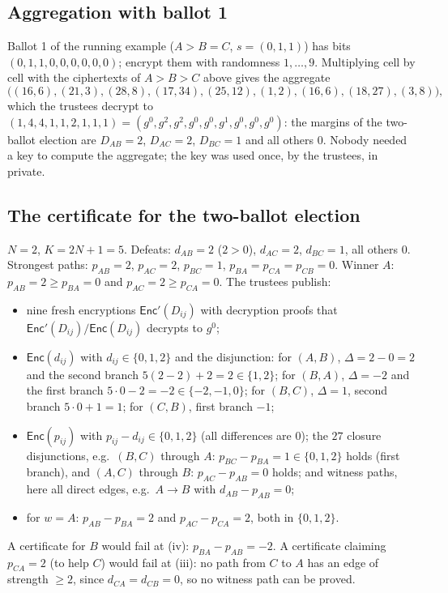 \documentclass[11pt,a4paper]{article}
\newcommand{\Enc}{\mathsf{Enc}}
\theoremstyle{remark}
\begin{document}
\subsection{Aggregation with ballot 1}
Ballot 1 of the running example ($A > B = C$, $s = (0, 1, 1)$) has bits
$(0, 1, 1, 0, 0, 0, 0, 0, 0)$; encrypt them with randomness $1, \ldots,
9$. Multiplying cell by cell with the ciphertexts of $A > B > C$ above
gives the aggregate
\[
  \big((16,6), (21,3), (28,8), (17,34), (25,12), (1,2), (16,6), (18,27), (3,8)\big),
\]
which the trustees decrypt to $(1, 4, 4, 1, 1, 2, 1, 1, 1) = (g^0, g^2,
g^2, g^0, g^0, g^1, g^0, g^0, g^0)$: the margins of the two-ballot
election are $D_{AB} = 2$, $D_{AC} = 2$, $D_{BC} = 1$ and all others
$0$. Nobody needed a key to compute the aggregate; the key was used once,
by the trustees, in private.

\subsection{The certificate for the two-ballot election}
$N = 2$, $K = 2N + 1 = 5$. Defeats: $d_{AB} = 2$ ($2 > 0$), $d_{AC} = 2$,
$d_{BC} = 1$, all others $0$. Strongest paths: $p_{AB} = 2$, $p_{AC} = 2$,
$p_{BC} = 1$, $p_{BA} = p_{CA} = p_{CB} = 0$. Winner $A$: $p_{AB} = 2 \ge
p_{BA} = 0$ and $p_{AC} = 2 \ge p_{CA} = 0$. The trustees publish:
\begin{itemize}[nosep]
  \item[(i)] nine fresh encryptions $\Enc'(D_{ij})$ with decryption
  proofs that $\Enc'(D_{ij}) / \Enc(D_{ij})$ decrypts to $g^0$;
  \item[(ii)] $\Enc(d_{ij})$ with $d_{ij} \in \{0, 1, 2\}$ and the
  disjunction: for $(A, B)$, $\Delta = 2 - 0 = 2$ and the second branch
  $5(2 - 2) + 2 = 2 \in \{1, 2\}$; for $(B, A)$, $\Delta = -2$ and the
  first branch $5 \cdot 0 - 2 = -2 \in \{-2, -1, 0\}$; for $(B, C)$,
  $\Delta = 1$, second branch $5 \cdot 0 + 1 = 1$; for $(C, B)$, first
  branch $-1$;
  \item[(iii)] $\Enc(p_{ij})$ with $p_{ij} - d_{ij} \in \{0, 1, 2\}$ (all
  differences are $0$); the $27$ closure disjunctions, e.g.\ $(B, C)$
  through $A$: $p_{BC} - p_{BA} = 1 \in \{0,1,2\}$ holds (first branch),
  and $(A, C)$ through $B$: $p_{AC} - p_{AB} = 0$ holds; and witness
  paths, here all direct edges, e.g.\ $A \to B$ with $d_{AB} - p_{AB} =
  0$;
  \item[(iv)] for $w = A$: $p_{AB} - p_{BA} = 2$ and $p_{AC} - p_{CA} =
  2$, both in $\{0, 1, 2\}$.
\end{itemize}
A certificate for $B$ would fail at (iv): $p_{BA} - p_{AB} = -2$. A
certificate claiming $p_{CA} = 2$ (to help $C$) would fail at (iii): no
path from $C$ to $A$ has an edge of strength $\ge 2$, since $d_{CA} =
d_{CB} = 0$, so no witness path can be proved.
\end{document}
